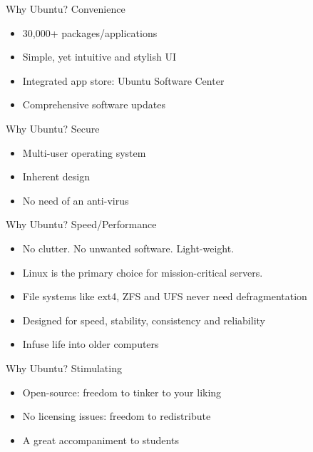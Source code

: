 \documentclass{beamer}
\begin{document}
 \begin{frame}{Why Ubuntu?}
  Convenience
   \begin{itemize}
    \item 30,000+ packages/applications
   \pause
    \item Simple, yet intuitive and stylish UI
   \pause
    \item Integrated app store: Ubuntu Software Center
   \pause
    \item Comprehensive software updates
   \end{itemize} 
 \end{frame}

 \begin{frame}{Why Ubuntu?}
  Secure
  \begin{itemize}
   \item Multi-user operating system
   \pause
   \item Inherent design
   \pause
   \item No need of an anti-virus
  \end{itemize}
 \end{frame}

 \begin{frame}{Why Ubuntu?}
  Speed/Performance
  \begin{itemize}
   \item No clutter. No unwanted software. Light-weight.
   \pause
   \item Linux is the primary choice for mission-critical servers.
   \pause
   \item File systems like ext4, ZFS and UFS never need defragmentation
   \pause
   \item Designed for speed, stability, consistency and reliability
   \pause
   \item Infuse life into older computers
  \end{itemize}
 \end{frame}

 \begin{frame}{Why Ubuntu?}
  Stimulating
  \begin{itemize}
   \item Open-source: freedom to tinker to your liking
   \pause
   \item No licensing issues: freedom to redistribute
   \pause
   \item A great accompaniment to students
  \end{itemize}
 \end{frame}
\end{document}
